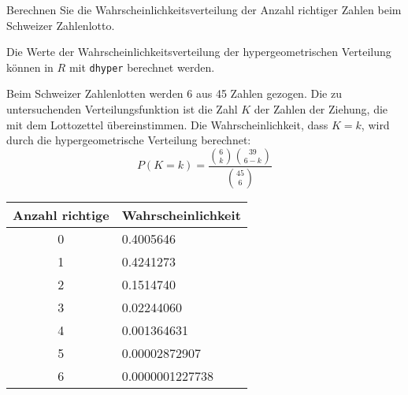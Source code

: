 Berechnen Sie die Wahrscheinlichkeitsverteilung der Anzahl
richtiger Zahlen beim Schweizer Zahlenlotto.

\begin{hinweis}
Die Werte der Wahrscheinlichkeitsverteilung
der hypergeometrischen Verteilung können
in $R$ mit {\tt dhyper} berechnet werden.
\end{hinweis}

\begin{loesung}
Beim Schweizer Zahlenlotten werden 6 aus 45 Zahlen
gezogen. Die zu untersuchenden Verteilungsfunktion ist die
Zahl $K$ der Zahlen der Ziehung, die mit dem Lottozettel
übereinstimmen.
Die Wahrscheinlichkeit, dass $K=k$,
wird durch die hypergeometrische Verteilung berechnet:
\[
P(K=k)=\frac{\binom{6}{k}\binom{39}{6-k}}{\binom{45}{6}}
\]
\begin{center}
\begin{tabular}{|c|l|}
\hline
Anzahl richtige&Wahrscheinlichkeit\\
\hline
0& 0.4005646\\
1& 0.4241273\\
2& 0.1514740\\
3& 0.02244060\\
4& 0.001364631\\
5& 0.00002872907\\
6& 0.0000001227738\\
\hline
\end{tabular}
\end{center}
\end{loesung}

